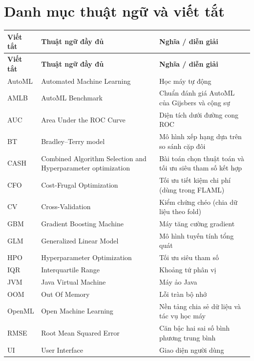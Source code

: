 \clearpage
\chapter*{Danh mục thuật ngữ và viết tắt}

\begin{longtable}{@{}l >{\raggedright\arraybackslash}p{6.2cm} >{\raggedright\arraybackslash}p{5.0cm}@{}}
\toprule
\textbf{Viết tắt} & \textbf{Thuật ngữ đầy đủ} & \textbf{Nghĩa / diễn giải} \\
\midrule
\endfirsthead
\toprule
\textbf{Viết tắt} & \textbf{Thuật ngữ đầy đủ} & \textbf{Nghĩa / diễn giải} \\
\midrule
\endhead
\bottomrule
\endfoot
AutoML & Automated Machine Learning & Học máy tự động \\
AMLB   & AutoML Benchmark & Chuẩn đánh giá AutoML của Gijsbers và cộng sự \\
AUC    & Area Under the ROC Curve & Diện tích dưới đường cong ROC \\
BT     & Bradley--Terry model & Mô hình xếp hạng dựa trên so sánh cặp đôi \\
CASH   & Combined Algorithm Selection and Hyperparameter optimization & Bài toán chọn thuật toán và tối ưu siêu tham số kết hợp \\
CFO    & Cost-Frugal Optimization & Tối ưu tiết kiệm chi phí (dùng trong FLAML) \\
CV     & Cross-Validation & Kiểm chứng chéo (chia dữ liệu theo fold) \\
GBM    & Gradient Boosting Machine & Máy tăng cường gradient \\
GLM    & Generalized Linear Model & Mô hình tuyến tính tổng quát \\
HPO    & Hyperparameter Optimization & Tối ưu siêu tham số \\
IQR    & Interquartile Range & Khoảng tứ phân vị \\
JVM    & Java Virtual Machine & Máy ảo Java \\
OOM    & Out Of Memory & Lỗi tràn bộ nhớ \\
OpenML & Open Machine Learning & Nền tảng chia sẻ dữ liệu và tác vụ học máy \\
RMSE   & Root Mean Squared Error & Căn bậc hai sai số bình phương trung bình \\
UI     & User Interface & Giao diện người dùng \\
\end{longtable}
